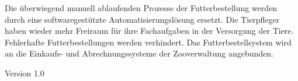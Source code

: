 %
{}{Die überwiegend manuell ablaufenden Prozesse der Futterbestellung werden durch eine softwaregestützte Automati\-sierungslösung ersetzt. Die Tierpfleger haben wieder mehr Freiraum für ihre Fachaufgaben in der Versorgung der Tiere. Fehlerhafte Futterbestellungen werden verhindert. Das Futterbestellsystem wird an die Einkaufs- und Abrechnungs\-systeme der Zooverwaltung angebunden.
\begin{flushright}
	 \textnormal{\textsf{\footnotesize{Version 1.0}}}
\end{flushright}
}%
{}{}%
{}%